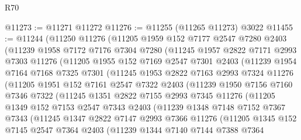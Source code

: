 \begin{lexlean}{R70}
\begin{coremodule}
@11273 := @11271 @11272
@11276 := @11255 (@11265 @11273) @3022
@11455 := @11244
    (@11250
      @11276
      (@11205
        @1959
        @152
        @7177
        @2547
        @7280
        @2403
        (@11239
          @1958
          @7172
          @7176
          @7304
          @7280
          (@11245
            @1957
            @2822
            @7171
            @2993
            @7303
            @11276
            (@11205
              @1955
              @152
              @7169
              @2547
              @7301
              @2403
              (@11239
                @1954
                @7164
                @7168
                @7325
                @7301
                (@11245
                  @1953
                  @2822
                  @7163
                  @2993
                  @7324
                  @11276
                  (@11205
                    @1951
                    @152
                    @7161
                    @2547
                    @7322
                    @2403
                    (@11239
                      @1950
                      @7156
                      @7160
                      @7346
                      @7322
                      (@11245
                        @1351
                        @2822
                        @7155
                        @2993
                        @7345
                        @11276
                        (@11205
                          @1349
                          @152
                          @7153
                          @2547
                          @7343
                          @2403
                          (@11239
                            @1348
                            @7148
                            @7152
                            @7367
                            @7343
                            (@11245
                              @1347
                              @2822
                              @7147
                              @2993
                              @7366
                              @11276
                              (@11205
                                @1345
                                @152
                                @7145
                                @2547
                                @7364
                                @2403
                                (@11239
                                  @1344
                                  @7140
                                  @7144
                                  @7388
                                  @7364

\end{coremodule}
\end{lexlean}
